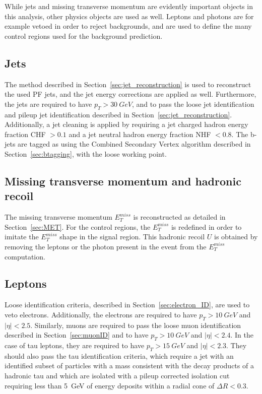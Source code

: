 While jets and missing transverse momentum are evidently important objects in this analysis, other physics objects are used as well. Leptons and photons are for example vetoed in order to reject backgrounds, and are used to define the many control regions used for the background prediction. 

\subsection{Jets}

The method described in Section~\ref{sec:jet_reconstruction} is used to reconstruct the used \ac{PF} jets, and the jet energy corrections are applied as well. Furthermore, the jets are required to have $p_T > \SI{30}{GeV}$, and to pass the loose jet identification and pileup jet identification described in Section~\ref{sec:jet_reconstruction}. Additionally, a jet cleaning is applied by requiring a jet charged hadron energy fraction CHF $> 0.1$ and a jet neutral hadron energy fraction NHF $< 0.8$. The b- jets are tagged as using the Combined Secondary Vertex algorithm described in Section~\ref{sec:btagging}, with the loose working point.

\subsection{Missing transverse momentum and hadronic recoil}

The missing transverse momentum $E_T^{miss}$ is reconstructed as detailed in Section~\ref{sec:MET}. For the control regions, the $E_T^{miss}$ is redefined in order to imitate the $E_T^{miss}$ shape in the signal region. This hadronic recoil $U$ is obtained by removing the leptons or the photon present in the event from the $E_T^{miss}$ computation.

\subsection{Leptons}

Loose identification criteria, described in Section~\ref{sec:electron_ID}, are used to veto electrons. Additionally, the electrons are required to have $p_T > \SI{10}{GeV}$ and $|\eta| < 2.5$. Similarly, muons are required to pass the loose muon identification described in Section~\ref{sec:muonID} and to have $p_T > \SI{10}{GeV}$ and $|\eta| < 2.4$. In the case of tau leptons, they are required to have $p_T > \SI{15}{GeV}$ and $|\eta| < 2.3$. They should also pass the tau identification criteria, which require a jet with an identified subset of particles with a mass consistent with the decay products of a hadronic tau and which are isolated with a pileup corrected isolation cut requiring less than \SI{5}{GeV} of energy deposits within a radial cone of $\Delta R < 0.3$. 

